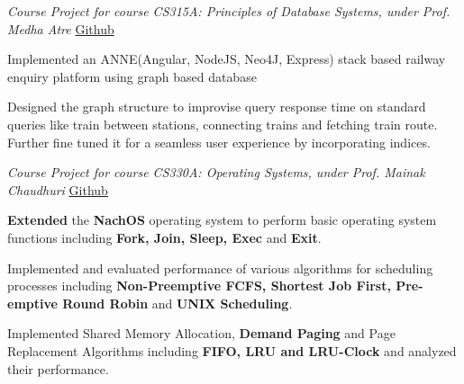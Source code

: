 \documentclass[a4paper]{norm-resume}
\begin{document}
    \vspace{5mm}

      
    \emph{Course Project for course CS315A: Principles of Database Systems, under Prof. Medha Atre} \hfill \small \href{https://github.com/ayush-tulsyan/RailQuery}{Github}
    \vspace{3mm}
    \begin{tightitemize}
    \small
    {
    \item Implemented an ANNE(Angular, NodeJS, Neo4J, Express) stack based railway enquiry platform using graph based database
    \item Designed the graph structure to improvise query response time on standard queries like train between stations, connecting trains and fetching train route. Further fine tuned it for a seamless user experience by incorporating indices.
    }
    \end{tightitemize}

    \vspace{5mm}

       
    \emph{Course Project for course CS330A: Operating Systems, under Prof. Mainak Chaudhuri} \hfill \small \href{https://github.com/sakshamsharma/cs330assignments}{Github}
    \vspace{3mm}
    \begin{tightitemize}
    \small
    {
    \item \textbf{Extended} the \textbf{NachOS} operating system to perform basic operating system functions including \textbf{Fork, Join, Sleep, Exec} and \textbf{Exit}.
    \item Implemented and evaluated performance of various algorithms for scheduling processes including \textbf{Non-Preemptive FCFS, Shortest Job First, Pre-emptive Round Robin} and \textbf{UNIX Scheduling}.
    \item Implemented Shared Memory Allocation, \textbf{Demand Paging} and Page Replacement Algorithms including \textbf{FIFO, LRU and LRU-Clock} and analyzed their performance.
    }
    \end{tightitemize}

    \vspace{5mm}
\end{document}
